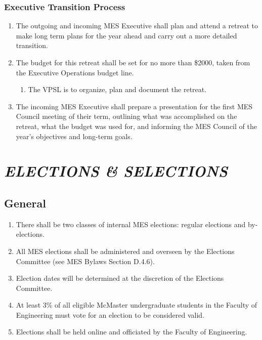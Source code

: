 \hypertarget{executive-transition-process}{%
 \subsubsection{Executive Transition
  Process}
 \label{executive-transition-process}}
\begin{enumerate}
 \item
  The outgoing and incoming MES Executive shall plan and attend a
  retreat to make long term plans for the year ahead and carry out a
  more detailed transition.
 \item
  The budget for this retreat shall be set for no more than \$2000,
  taken from the Executive Operations budget line.

  \begin{enumerate}
   \item
    The VPSL is to organize, plan and document the retreat.
  \end{enumerate}
 \item
  The incoming MES Executive shall prepare a presentation for the first
  MES Council meeting of their term, outlining what was accomplished on
  the retreat, what the budget was used for, and informing the MES
  Council of the year's objectives and long-term goals.
\end{enumerate}


\hypertarget{elections-selections}{%
 \section{\texorpdfstring{\emph{ELECTIONS \&
     SELECTIONS}}{ELECTIONS \& SELECTIONS}}
 \label{elections-selections}}
\hypertarget{general}{%
 \subsection{General}
 \label{general}}
\begin{enumerate}
 \item
  There shall be two classes of internal MES elections: regular
  elections and by-elections.
 \item
  All MES elections shall be administered and overseen by the Elections
  Committee (see MES Bylaws Section D.4.6).
 \item
  Election dates will be determined at the discretion of the Elections
  Committee.
 \item
  At least 3\% of all eligible McMaster undergraduate students in the
  Faculty of Engineering must vote for an election to be considered
  valid.
 \item
  Elections shall be held online and officiated by the Faculty of
  Engineering.

\end{enumerate}

